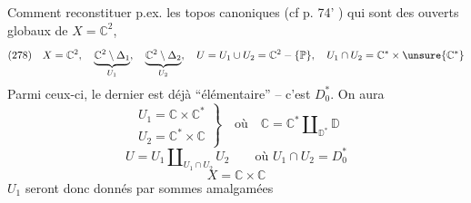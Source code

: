 Comment reconstituer p.ex. les   topos canoniques (cf p. 74' ) qui sont des ouverts globaux de $X=\mathbb C^2$, 
\[
(278)\quad X=\mathbb C^2,\quad
\underbrace{\mathbb C^2\setminus\Delta_1}_{U_1},\quad
\underbrace{\mathbb C^2\setminus\Delta_2}_{U_2},\quad
U=U_1\cup U_2=\mathbb C^2-\{\mathbb P\},\quad
U_1\cap U_2=\mathbb C^*\times\unsure{\mathbb C^*}
\]
Parmi ceux-ci,  le dernier est déjà ``élémentaire'' -- c'est $D_0^*$. On aura
\[
\left.\begin{array}{l}
U_1=\mathbb C\times\mathbb C^*\\
U_2=\mathbb C^*\times\mathbb C
\end{array}\right\}\quad\text{où}\quad
\mathbb C=\mathbb C^*\amalg_{\mathbb D^*}\mathbb D
\]
\[
U=U_1\amalg_{U_1\cap U_2}U_2\qquad\text{où }U_1\cap U_2=D_0^*
\]
\[
X=\mathbb C\times\mathbb C
\]
$U_1$ seront donc donnés par sommes amalgamées

